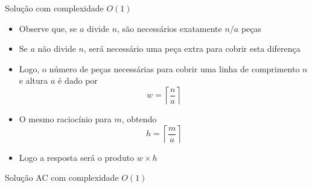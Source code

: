\begin{frame}[fragile]{Solução com complexidade $O(1)$}

    \begin{itemize}
        \item Observe que, se $a$ divide $n$, são necessários exatamente $n/a$ peças

        \item Se $a$ não divide $n$, será necessário uma peça extra para cobrir esta diferença

        \item Logo, o número de peças necessárias para cobrir uma linha de comprimento $n$ e 
            altura $a$ é dado por
        \[
            w = \left\lceil \frac{n}{a}\right\rceil
        \]

        \item O mesmo raciocínio para $m$, obtendo
        \[
            h = \left\lceil \frac{m}{a}\right\rceil
        \]

        \item Logo a resposta será o produto $w \times h$

    \end{itemize}

\end{frame}

\begin{frame}[fragile]{Solução AC com complexidade $O(1)$}
\end{frame}
